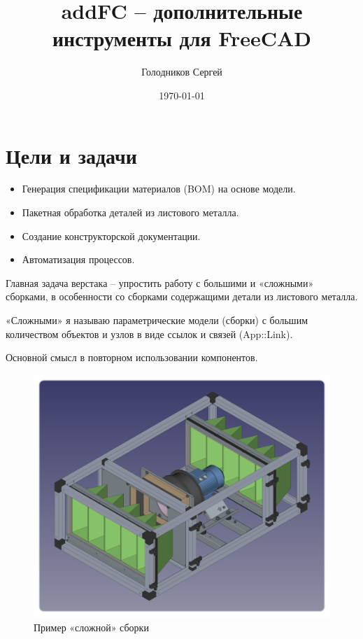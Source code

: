 \documentclass[a4paper,12pt]{article}
\title{addFC -- дополнительные инструменты для FreeCAD}
\author{Голодников Сергей}
\date{\today}
\begin{document}
\maketitle




\section{Цели и задачи}

\begin{itemize}
	\item Генерация спецификации материалов (BOM) на основе модели.
	\item Пакетная обработка деталей из листового металла.
	\item Создание конструкторской документации.
	\item Автоматизация процессов.
\end{itemize}

Главная задача верстака -- упростить работу с большими и «сложными» сборками, в особенности со сборками содержащими детали из листового металла.

«Сложными» я называю параметрические модели (сборки) с большим количеством объектов и узлов в виде ссылок и связей (App::Link).

Основной смысл в повторном использовании компонентов.

\begin{figure}[htp]
	\centering
	\includegraphics[scale=0.48]{img/assembly_example.png}
	\caption{Пример «сложной» сборки}
	\label{sec:assembly_example}
\end{figure}
\end{document}
